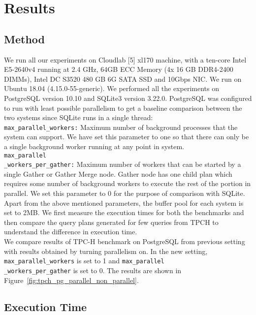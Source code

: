 \section{Results}
\label{sec:results}

\subsection{Method}
We run all our experiments on Cloudlab [5] xl170 machine, with a ten-core Intel E5-2640v4 running at 2.4 GHz, 64GB ECC Memory (4x 16 GB DDR4-2400 DIMMs), Intel DC S3520 480 GB 6G SATA SSD and 10Gbps NIC. We run on Ubuntu 18.04 (4.15.0-55-generic). We performed all the experiments on PostgreSQL version 10.10 and SQLite3 version 3.22.0. PostgreSQL was configured to run with least possible parallelism to get a baseline comparison between the two systems since SQLite runs in a single thread:\\
\texttt{max\_parallel\_workers:} Maximum number of background processes that the system can support.
We have set this parameter to one so that there can only be a single background worker running at any point in system.\\
\texttt{max\_parallel\\\_workers\_per\_gather:} Maximum number of workers that can be started by a single Gather or Gather Merge node. Gather node has one child plan which requires some number of background workers to execute the rest of the portion in parallel. We set this parameter to 0 for the purpose of comparison with SQLite.
Apart from the above mentioned parameters, the buffer pool for each system is set to 2MB.
We first measure the execution times for both the benchmarks and then compare the query plans generated for few queries from TPCH to understand the difference in execution time.\\
We compare results of TPC-H benchmark on PostgreSQL from previous setting with results obtained by turning parallelism on. In the new setting, \texttt{max\_parallel\_workers} is set to 1 and \texttt{max\_parallel\\\_workers\_per\_gather} is set to 0. The results are shown in Figure~\ref{fig:tpch_pg_parallel_non_parallel}.

\subsection{Execution Time}
\label{sec:time}


